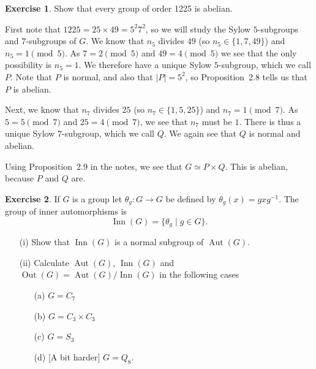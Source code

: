 \documentclass{amsart}
\DeclareMathOperator{\Aut}{Aut}
\DeclareMathOperator{\Inn}{Inn}
\DeclareMathOperator{\Out}{Out}
\newcommand{\xra}{\xrightarrow}
\renewcommand{\:}{\colon}
\newcommand{\tm}{\times}
\newcommand{\tht}       {\theta}
\theoremstyle{definition}
\newtheorem{exercise}{Exercise}
\newenvironment{solution}{{\noindent\bf Solution:}}{}
\begin{document}
\begin{exercise}
 Show that every group of order 1225 is abelian.
\end{exercise}
\begin{solution}
 First note that $1225=25\tm 49=5^2 7^2$, so we will study the Sylow
 $5$-subgroups and $7$-subgroups of $G$.  We know that $n_5$ divides
 $49$ (so $n_5\in\{1,7,49\}$) and $n_5=1\pmod{5}$.  As $7=2\pmod{5}$
 and $49=4\pmod{5}$ we see that the only possibility is $n_5=1$.  We
 therefore have a unique Sylow $5$-subgroup, which we call $P$.  Note
 that $P$ is normal, and also that $|P|=5^2$, so Proposition~2.8 tells
 us that $P$ is abelian.

 Next, we know that $n_7$ divides $25$ (so $n_7\in\{1,5,25\}$) and
 $n_7=1\pmod{7}$.  As $5=5\pmod{7}$ and $25=4\pmod{7}$, we see that
 $n_7$ must be $1$.  There is thus a unique Sylow $7$-subgroup, which
 we call $Q$.  We again see that $Q$ is normal and abelian.

 Using Proposition~2.9 in the notes, we see that $G\simeq P\tm Q$.
 This is abelian, because $P$ and $Q$ are.
\end{solution}

\begin{exercise}
 If $G$ is a group let $\tht_g\:G\xra{}G$ be defined by
 $\tht_g(x)=gxg^{-1}$. The group of inner automorphisms is
 \[ \Inn (G)=\{ \theta_g \; |\; g \in G\}. \]
 \begin{itemize}
  \item[(i)] Show that $\Inn(G)$ is a normal subgroup of $\Aut(G)$.
  \item[(ii)] Calculate $\Aut(G)$, $\Inn(G)$ and $\Out(G)=\Aut(G)/\Inn(G)$
  in the following cases
  \begin{itemize}
  \item[(a)] $G=C_7$
  \item[(b)] $G=C_3 \times C_3$
  \item[(c)] $G=S_3$
  \item[(d)] [A bit harder] $G=Q_8$.
  \end{itemize}
 \end{itemize}
\end{exercise}
\begin{solution}
 
\end{solution}
\end{document}
